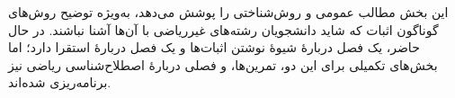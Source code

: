\documentclass[../../include/open-logic-part]{subfiles}
\begin{document}

\begin{editorial}
  این بخش مطالب عمومی و روش‌شناختی را پوشش می‌دهد، به‌ویژه توضیح
  روش‌های گوناگون اثبات که شاید دانشجویان رشته‌های غیرریاضی با آن‌ها
  آشنا نباشند. در حال حاضر، یک فصل دربارهٔ شیوهٔ نوشتن اثبات‌ها و
  یک فصل دربارهٔ استقرا دارد؛ اما بخش‌های تکمیلی برای این دو،
  تمرین‌ها، و فصلی دربارهٔ اصطلاح‌شناسی ریاضی نیز برنامه‌ریزی
  شده‌اند.
\end{editorial}



\OLEndPartHook
\end{document}
